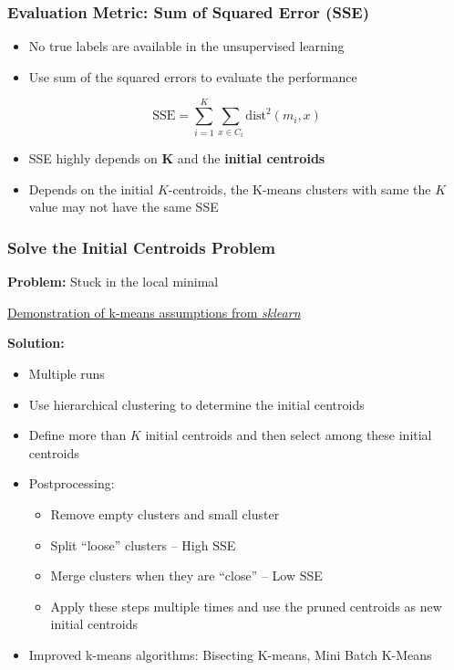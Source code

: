 \documentclass[aspectratio=169, 10pt]{beamer}
\begin{document}
\begin{frame}
    \frametitle{Evaluation Metric: Sum of Squared Error (SSE)}
    
    \begin{itemize}
        \item No true labels are available in the unsupervised learning
        \item Use sum of the squared errors to evaluate the performance
    \end{itemize}

    \[
        \text{SSE} = \sum^{K}_{i=1} \sum_{x \in C_i} \text{dist}^2(m_i, x)
    \]

    \begin{itemize}
        \item SSE highly depends on \textbf{K} and the \textbf{initial centroids}
        \item Depends on the initial $K$-centroids, the K-means clusters with same the $K$ value may not have the same SSE
    \end{itemize}
    
\end{frame}

\begin{frame}
    \frametitle{Solve the Initial Centroids Problem}
    
    \textbf{Problem:} Stuck in the local minimal 

    \begin{example}
        \href{https://scikit-learn.org/stable/auto\_examples/cluster/plot\_kmeans\_assumptions.html}{Demonstration of k-means assumptions from \textit{sklearn}}
    \end{example}

    \textbf{Solution:}
    \begin{itemize}
        \item Multiple runs
        \item Use hierarchical clustering to determine the initial centroids
        \item Define more than $K$ initial centroids and then select among these initial centroids
        \item Postprocessing:
            \begin{itemize}
                \item Remove empty clusters and small cluster
                \item Split ``loose'' clusters -- High SSE
                \item Merge clusters when they are ``close'' -- Low SSE
                \item Apply these steps multiple times and use the pruned centroids as new initial centroids
            \end{itemize}
        \item Improved k-means algorithms: Bisecting K-means, Mini Batch K-Means
    \end{itemize}
 
\end{frame}
\end{document}
